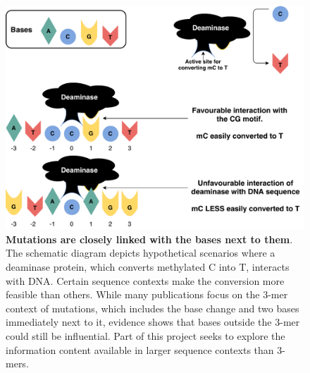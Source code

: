 \begin{figure}[h!]
    \centering
    \includegraphics[scale=0.78]{graphics/motif_demo.pdf}
    \caption{\textbf{Mutations are closely linked with the bases next to them}. The schematic diagram depicts hypothetical scenarios where a deaminase protein, which converts methylated C into T, interacts with DNA. Certain sequence contexts make the conversion more feasible than others. While many publications focus on the 3-mer context of mutations, which includes the base change and two bases immediately next to it, evidence shows that bases outside the 3-mer could still be influential. Part of this project seeks to explore the information content available in larger sequence contexts than 3-mers.}
    \label{fig:motif_demo}
\end{figure}
